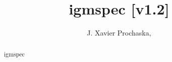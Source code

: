 \documentclass[12pt,preprint]{aastex}
\begin{document}
\def\nhdlls{154}
\def\ntot{16X}
\def\npair{XX}
\def\nslls{99}
\def\hub{h_{72}^{-1}}
\def\umfp{{\hub \, \rm Mpc}}
\def\mew{W_\lambda}
\def\ew{$\mew$}
\def\mzq{z_q}
\def\mfmin{f_{\rm min}}
\def\fmin{$\mfmin$}
\def\zabs{$z_{\rm abs}$}
\def\mzabs{z_{\rm abs}}
\def\msna{{\rm S/N}^{\rm A}_{912}}
\def\sna{S/N$^{\rm A}_{912}$}
\def\mnull{\nu_{\rm 912}}
\def\nnull{$\nu_{\rm 912}$}
\def\intl{\int\limits}
\def\nstatqso{193}
\def\maxoff{0.4}
\def\clls{1.9 \pm 0.2}
\def\alls{5.2 \pm 1.5}
\def\blls{-0.9^{+0.4}_{-0.05}}
\def\cmma{\;\;\; ,}
\def\perd{\;\;\; .}
\def\ltk{\left [ \,}
\def\ltp{\left ( \,}
\def\ltb{\left \{ \,}
\def\rtk{\, \right  ] }
\def\rtp{\, \right  ) }
\def\rtb{\, \right \} }
\def\sci#1{{\; \times \; 10^{#1}}}
\def \rAA {\rm \AA}
\def \mzem {z_{\rm em}}
\def\smm{\sum\limits}
\def \cmm  {cm$^{-2}$}
\def \cmmm {cm$^{-3}$}
\def \kms  {km~s$^{-1}$}
\def \mkms  {{\rm km~s^{-1}}}
\def \lyaf {Ly$\alpha$ forest}
\def \Lya  {Ly$\alpha$}
\def \lya  {Ly$\alpha$}
\def \mlya  {Ly\alpha}
\def \Lyb  {Ly$\beta$}
\def \nhi  {$N_{\rm HI}$}
\def \mnhi  {N_{\rm HI}}
\def \lnhi {$\log N_{HI}$}
\def \mlnhi {\log N_{HI}}
\def \etal {\textit{et al.}}
\def \ob {$\Omega_b$}
\def \obh {$\Omega_bh^{-2}$}
\def \om {$\Omega_m$}
\def \ol {$\Omega_{\Lambda}$}
\def \gz {$g(z)$}
\def \mgz {g(z)}
\def \lyaf {Lyman--$\alpha$ forest}
\def \fnhi {$f(\mnhi,X)$}
\def \mfnhi {f(\mnhi,X)}
\def \mnmin {\mnhi^{\rm min}}
\def \nmin {$\mnhi^{\rm min}$}
\newcommand{\cm}[1]{\, {\rm cm^{#1}}}
\def\N#1{{N({\rm #1})}}
\def\psol#1#2#3#4{$\{ {\rm #1}^{#2}/{\rm #3}^{#4}\}$}
\def\pxh{$\{ {\rm X/H} \}$}
\def \snrlim {SNR$_{lim}$}
\def\mglls {\gamma_{\rm LLS}}
\def\mavgt {<\mtll>}

\title{igmspec
[v1.2]}

\author{
J. Xavier Prochaska, 
}

\begin{abstract}
igmspec 
\end{abstract}


\end{document}
